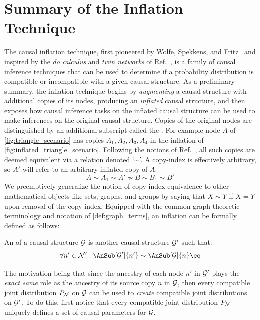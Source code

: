 \documentclass[aps, 10pt, english, twoside, pra, nofootinbib, longbibliography]{revtex4-1}
\begin{document}

    \section{Summary of the Inflation Technique}
    \label{sec:summary_inflation}
    The causal inflation technique, first pioneered by Wolfe, Spekkens, and Fritz~\cite{Inflation} and inspired by the \textit{do calculus} and \textit{twin networks} of Ref.~\cite{Pearl_2009}, is a family of causal inference techniques that can be used to determine if a probability distribution is compatible or incompatible with a given causal structure. As a preliminary summary, the inflation technique begins by \textit{augmenting} a causal structure with additional copies of its nodes, producing an \textit{inflated} causal structure, and then exposes how causal inference tasks on the inflated causal structure can be used to make inferences on the original causal structure. Copies of the original nodes are distinguished by an additional subscript called the . For example node $A$ of \cref{fig:triangle_scenario} has copies $A_1, A_2, A_3, A_4$ in the inflation of \cref{fig:inflated_triangle_scenario}. Following the notions of Ref.~\cite{Inflation}, all such copies are deemed equivalent via a  relation denoted `$\sim$'. A copy-index is effectively arbitrary, so $A'$ will refer to an arbitrary inflated copy of $A$.
    \[ A \sim A_1 \sim A' \not\sim B \sim B_1 \sim B' \]
    We preemptively generalize the notion of copy-index equivalence to other mathematical objects like sets, graphs, and groups by saying that $X \sim Y$ if $X = Y$ upon removal of the copy-index. Equipped with the common graph-theoretic terminology and notation of \cref{def:graph_terms}, an inflation can be formally defined as follows:
    \begin{definition}
        An  of a causal structure $\mathcal{G}$ is another causal structure $\mathcal{G}'$ such that:
        \[ \forall n' \in \nodes': \AnSub[\graph']{n'} \sim \AnSub[\graph]{n} \eq \label{eq:inflation_defn}\]
    \end{definition}
    The motivation being that since the ancestry of each node $n'$ in $\mathcal{G}'$ plays the \textit{exact same} role as the ancestry of its source copy $n$ in $\mathcal{G}$, then every compatible joint distribution $\prob[\nodes]$ on $\mathcal{G}$ can be used to \textit{create} compatible joint distributions on $\mathcal{G}'$. To do this, first notice that every compatible joint distribution $\prob[\nodes]$ uniquely defines a set of causal parameters for $\mathcal{G}$.
\end{document}
